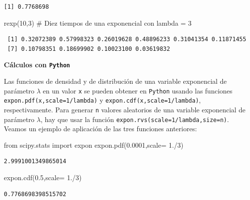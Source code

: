 \documentclass[
  letterpaper,
  DIV=11,
  numbers=noendperiod]{scrreprt}
\newenvironment{Shaded}{\begin{snugshade}}{\end{snugshade}}
\newcommand{\CommentTok}[1]{\textcolor[rgb]{0.37,0.37,0.37}{#1}}
\newcommand{\DecValTok}[1]{\textcolor[rgb]{0.68,0.00,0.00}{#1}}
\newcommand{\FloatTok}[1]{\textcolor[rgb]{0.68,0.00,0.00}{#1}}
\newcommand{\FunctionTok}[1]{\textcolor[rgb]{0.28,0.35,0.67}{#1}}
\newcommand{\ImportTok}[1]{\textcolor[rgb]{0.00,0.46,0.62}{#1}}
\newcommand{\NormalTok}[1]{\textcolor[rgb]{0.00,0.23,0.31}{#1}}
\newcommand{\OperatorTok}[1]{\textcolor[rgb]{0.37,0.37,0.37}{#1}}
\begin{document}
\begin{verbatim}
[1] 0.7768698
\end{verbatim}

\begin{Shaded}
\begin{Highlighting}[]
\FunctionTok{rexp}\NormalTok{(}\DecValTok{10}\NormalTok{,}\DecValTok{3}\NormalTok{) }\CommentTok{\# Diez tiempos de una exponencial con lambda = 3}
\end{Highlighting}
\end{Shaded}

\begin{verbatim}
 [1] 0.32072389 0.57998323 0.26019628 0.48896233 0.31041354 0.11871455
 [7] 0.10798351 0.18699902 0.10023100 0.03619832
\end{verbatim}

\textbf{Cálculos con \texttt{Python}}

Las funciones de densidad y de distribución de una variable exponencial
de parámetro \(\lambda\) en un valor \texttt{x} se pueden obtener en
\texttt{Python} usando las funciones
\texttt{expon.pdf(x,scale=1/lambda)} y
\texttt{expon.cdf(x,scale=1/lambda)}, respectivamente. Para generar
\texttt{n} valores aleatorios de una variable exponencial de parámetro
\(\lambda\), hay que usar la función
\texttt{expon.rvs(scale=1/lambda,size=n)}. Veamos un ejemplo de
aplicación de las tres funciones anteriores:

\begin{Shaded}
\begin{Highlighting}[]
\ImportTok{from}\NormalTok{ scipy.stats }\ImportTok{import}\NormalTok{ expon}
\NormalTok{expon.pdf(}\FloatTok{0.0001}\NormalTok{,scale}\OperatorTok{=} \FloatTok{1.}\OperatorTok{/}\DecValTok{3}\NormalTok{)}
\end{Highlighting}
\end{Shaded}

\begin{verbatim}
2.9991001349865014
\end{verbatim}

\begin{Shaded}
\begin{Highlighting}[]
\NormalTok{expon.cdf(}\FloatTok{0.5}\NormalTok{,scale}\OperatorTok{=} \FloatTok{1.}\OperatorTok{/}\DecValTok{3}\NormalTok{) }
\end{Highlighting}
\end{Shaded}

\begin{verbatim}
0.7768698398515702
\end{verbatim}
\end{document}
